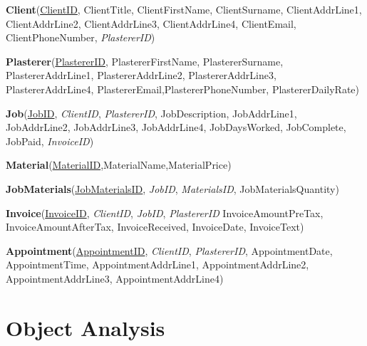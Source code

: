\begin{center}
	\textbf{Client}(\underline{ClientID}, ClientTitle, ClientFirstName, ClientSurname, ClientAddrLine1, ClientAddrLine2, ClientAddrLine3, ClientAddrLine4, ClientEmail, ClientPhoneNumber, \emph{PlastererID})
\end{center}



\begin{center}
	\textbf{Plasterer}(\underline{PlastererID}, PlastererFirstName, PlastererSurname, PlastererAddrLine1, PlastererAddrLine2, PlastererAddrLine3, PlastererAddrLine4, PlastererEmail,PlastererPhoneNumber, PlastererDailyRate)
\end{center}



\begin{center}
\textbf{Job}(\underline{JobID}, \emph{ClientID}, \emph{PlastererID}, JobDescription, JobAddrLine1, JobAddrLine2, JobAddrLine3, JobAddrLine4, JobDaysWorked,  JobComplete, JobPaid, \emph{InvoiceID})
\end{center}


\begin{center}
\textbf{Material}(\underline{MaterialID},MaterialName,MaterialPrice)
\end{center}


\begin{center}
\textbf{JobMaterials}(\underline{JobMaterialsID}, \emph{JobID}, \emph{MaterialsID}, JobMaterialsQuantity)
\end{center}


\begin{center}
\textbf{Invoice}(\underline{InvoiceID}, \emph{ClientID}, \emph{JobID}, \emph{PlastererID} InvoiceAmountPreTax, InvoiceAmountAfterTax, InvoiceReceived, InvoiceDate, InvoiceText)
\end{center}



\begin{center}
\textbf{Appointment}(\underline{AppointmentID}, \emph{ClientID}, \emph{PlastererID}, AppointmentDate, AppointmentTime, AppointmentAddrLine1, AppointmentAddrLine2, AppointmentAddrLine3, AppointmentAddrLine4)
\end{center}



\section{Object Analysis}

